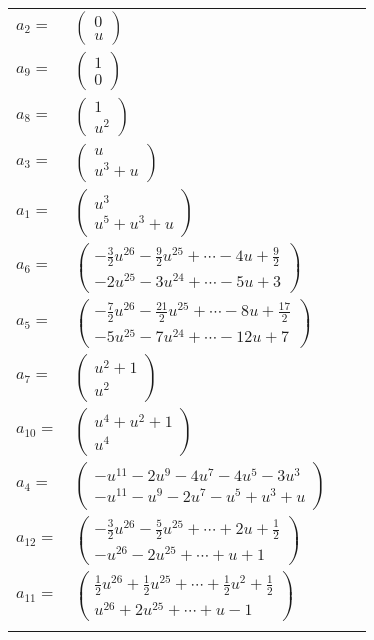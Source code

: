 \documentclass[1p]{elsarticle_modified}
\theoremstyle{definition}
\begin{document}
\begin{tabular}{m{7pt} m{180pt} m{7pt} m{180pt} }
\flushright $a_{2}=$&$\begin{pmatrix}0\\u\end{pmatrix}$ \\
\flushright $a_{9}=$&$\begin{pmatrix}1\\0\end{pmatrix}$ \\
\flushright $a_{8}=$&$\begin{pmatrix}1\\u^2\end{pmatrix}$ \\
\flushright $a_{3}=$&$\begin{pmatrix}u\\u^3+u\end{pmatrix}$ \\
\flushright $a_{1}=$&$\begin{pmatrix}u^3\\u^5+u^3+u\end{pmatrix}$ \\
\flushright $a_{6}=$&$\begin{pmatrix}-\frac{3}{2} u^{26}-\frac{9}{2} u^{25}+\cdots-4 u+\frac{9}{2}\\-2 u^{25}-3 u^{24}+\cdots-5 u+3\end{pmatrix}$ \\
\flushright $a_{5}=$&$\begin{pmatrix}-\frac{7}{2} u^{26}-\frac{21}{2} u^{25}+\cdots-8 u+\frac{17}{2}\\-5 u^{25}-7 u^{24}+\cdots-12 u+7\end{pmatrix}$ \\
\flushright $a_{7}=$&$\begin{pmatrix}u^2+1\\u^2\end{pmatrix}$ \\
\flushright $a_{10}=$&$\begin{pmatrix}u^4+u^2+1\\u^4\end{pmatrix}$ \\
\flushright $a_{4}=$&$\begin{pmatrix}- u^{11}-2 u^9-4 u^7-4 u^5-3 u^3\\- u^{11}- u^9-2 u^7- u^5+u^3+u\end{pmatrix}$ \\
\flushright $a_{12}=$&$\begin{pmatrix}-\frac{3}{2} u^{26}-\frac{5}{2} u^{25}+\cdots+2 u+\frac{1}{2}\\- u^{26}-2 u^{25}+\cdots+u+1\end{pmatrix}$ \\
\flushright $a_{11}=$&$\begin{pmatrix}\frac{1}{2} u^{26}+\frac{1}{2} u^{25}+\cdots+\frac{1}{2} u^2+\frac{1}{2}\\u^{26}+2 u^{25}+\cdots+u-1\end{pmatrix}$\\&\end{tabular}
\end{document}
